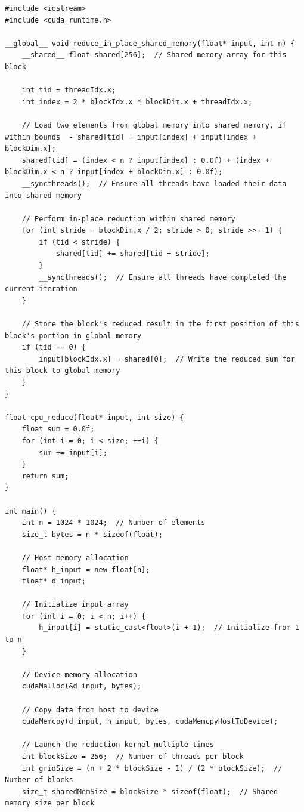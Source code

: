 \begin{lstlisting}
#include <iostream>
#include <cuda_runtime.h>

__global__ void reduce_in_place_shared_memory(float* input, int n) {
    __shared__ float shared[256];  // Shared memory array for this block

    int tid = threadIdx.x;
    int index = 2 * blockIdx.x * blockDim.x + threadIdx.x;

    // Load two elements from global memory into shared memory, if within bounds  - shared[tid] = input[index] + input[index + blockDim.x];
    shared[tid] = (index < n ? input[index] : 0.0f) + (index + blockDim.x < n ? input[index + blockDim.x] : 0.0f);
    __syncthreads();  // Ensure all threads have loaded their data into shared memory

    // Perform in-place reduction within shared memory
    for (int stride = blockDim.x / 2; stride > 0; stride >>= 1) {
        if (tid < stride) {
            shared[tid] += shared[tid + stride];
        }
        __syncthreads();  // Ensure all threads have completed the current iteration
    }

    // Store the block's reduced result in the first position of this block's portion in global memory
    if (tid == 0) {
        input[blockIdx.x] = shared[0];  // Write the reduced sum for this block to global memory
    }
}

float cpu_reduce(float* input, int size) {
    float sum = 0.0f;
    for (int i = 0; i < size; ++i) {
        sum += input[i];
    }
    return sum;
}

int main() {
    int n = 1024 * 1024;  // Number of elements
    size_t bytes = n * sizeof(float);

    // Host memory allocation
    float* h_input = new float[n];
    float* d_input;

    // Initialize input array
    for (int i = 0; i < n; i++) {
        h_input[i] = static_cast<float>(i + 1);  // Initialize from 1 to n
    }

    // Device memory allocation
    cudaMalloc(&d_input, bytes);

    // Copy data from host to device
    cudaMemcpy(d_input, h_input, bytes, cudaMemcpyHostToDevice);

    // Launch the reduction kernel multiple times
    int blockSize = 256;  // Number of threads per block
    int gridSize = (n + 2 * blockSize - 1) / (2 * blockSize);  // Number of blocks
    size_t sharedMemSize = blockSize * sizeof(float);  // Shared memory size per block


\end{lstlisting}
